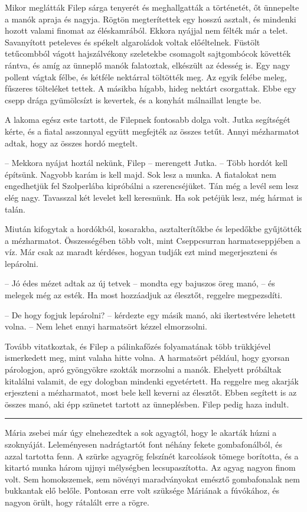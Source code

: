 \documentclass[10pt]{memoir}
\renewcommand{\pfbreakdisplay}{\bigskip \ding{166} \bigskip}
\newcommand{\secbreak}{\fancybreak{\pfbreakdisplay}\indent}
\begin{document}
Mikor meglátták Filep sárga tenyerét és meghallgatták a történetét, őt
ünnepelte a manók apraja és nagyja. Rögtön megterítettek egy hosszú asztalt, és
mindenki hozott valami finomat az éléskamrából. Ekkora nyájjal nem félték már a
telet. Savanyított peteleves és spékelt algaroládok voltak előéltelnek. Füstölt
tetűcombból vágott hajszálvékony szeletekbe csomagolt sajtgombócok követték
rántva, és amíg az ünneplő manók falatoztak, elkészült az édesség is. Egy nagy
pollent vágtak félbe, és kétféle nektárral töltötték meg. Az egyik felébe
meleg, fűszeres tölteléket tettek. A másikba hígabb, hideg nektárt csorgattak.
Ebbe egy csepp drága gyümölcsízt is kevertek, és a konyhát málnaillat lengte
be.

A lakoma egész este tartott, de Filepnek fontosabb dolga volt. Jutka segítségét
kérte, és a fiatal asszonnyal együtt megfejték az összes tetűt. Annyi
mézharmatot adtak, hogy az összes hordó megtelt.

-- Mekkora nyájat hoztál nekünk, Filep -- merengett Jutka. -- Több hordót
kell építsünk. Nagyobb karám is kell majd. Sok lesz a munka. A fiatalokat nem
engedhetjük fel Szolperlába kipróbálni a szerencséjüket. Tán még a levél sem
lesz elég nagy. Tavasszal két levelet kell keresnünk. Ha sok petéjük lesz, még
hármat is talán.

Miután kifogytak a hordókból, kosarakba, asztalterítőkbe és lepedőkbe
gyűjtötték a mézharmatot. Összességében több volt, mint Cseppcsurran
harmatcseppjében a víz. Már csak az maradt kérdéses, hogyan tudják ezt mind
megerjeszteni és lepárolni.

-- Jó édes mézet adtak az új tetvek -- mondta egy bajuszos öreg manó, -- és
melegek még az esték. Ha most hozzáadjuk az élesztőt, reggelre megpezsdíti.

-- De hogy fogjuk lepárolni? -- kérdezte egy másik manó, aki ikertestvére
lehetett volna. -- Nem lehet ennyi harmatsört kézzel elmorzsolni.

Tovább vitatkoztak, és Filep a pálinkafőzés folyamatának több trükkjével
ismerkedett meg, mint valaha hitte volna. A harmatsört például, hogy gyorsan
párologjon, apró gyöngyökre szokták morzsolni a manók. Ehelyett próbáltak
kitalálni valamit, de egy dologban mindenki egyetértett. Ha reggelre meg
akarják erjeszteni a mézharmatot, most bele kell keverni az élesztőt. Ebben
segített is az összes manó, aki épp szünetet tartott az ünneplésben. Filep
pedig haza indult.

\secbreak

Mária zsebei már úgy elnehezedtek a sok agyagtól, hogy le akarták húzni a
szoknyáját. Leleményesen nadrágtartót font néhány fekete gombafonálból, és
azzal tartotta fenn. A szürke agyagrög felszínét karcolások tömege borította,
és a kitartó munka három ujjnyi mélységben lecsupaszította. Az agyag nagyon
finom volt. Sem homokszemek, sem növényi maradványokat emésztő gombafonalak nem
bukkantak elő belőle. Pontosan erre volt szüksége Máriának a fúvókához, és
nagyon örült, hogy rátalált erre a rögre.
\end{document}
